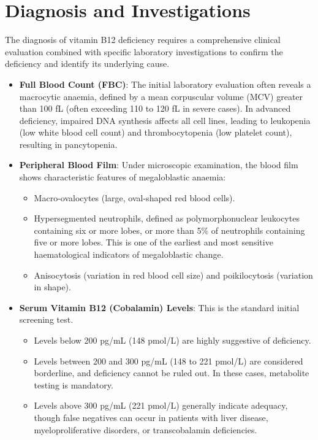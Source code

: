 \section*{Diagnosis and Investigations}
The diagnosis of vitamin B12 deficiency requires a comprehensive clinical evaluation combined with specific laboratory investigations to confirm the deficiency and identify its underlying cause.

\begin{itemize}
    \item \textbf{Full Blood Count (FBC)}: The initial laboratory evaluation often reveals a macrocytic anaemia, defined by a mean corpuscular volume (MCV) greater than 100 fL (often exceeding 110 to 120 fL in severe cases). In advanced deficiency, impaired DNA synthesis affects all cell lines, leading to leukopenia (low white blood cell count) and thrombocytopenia (low platelet count), resulting in pancytopenia.
    \item \textbf{Peripheral Blood Film}: Under microscopic examination, the blood film shows characteristic features of megaloblastic anaemia:
    \begin{itemize}
        \item Macro-ovalocytes (large, oval-shaped red blood cells).
        \item Hypersegmented neutrophils, defined as polymorphonuclear leukocytes containing six or more lobes, or more than 5\% of neutrophils containing five or more lobes. This is one of the earliest and most sensitive haematological indicators of megaloblastic change.
        \item Anisocytosis (variation in red blood cell size) and poikilocytosis (variation in shape).
    \end{itemize}
    \item \textbf{Serum Vitamin B12 (Cobalamin) Levels}: This is the standard initial screening test.
    \begin{itemize}
        \item Levels below 200 pg/mL (148 pmol/L) are highly suggestive of deficiency.
        \item Levels between 200 and 300 pg/mL (148 to 221 pmol/L) are considered borderline, and deficiency cannot be ruled out. In these cases, metabolite testing is mandatory.
        \item Levels above 300 pg/mL (221 pmol/L) generally indicate adequacy, though false negatives can occur in patients with liver disease, myeloproliferative disorders, or transcobalamin deficiencies.

\end{itemize}
\end{itemize}
